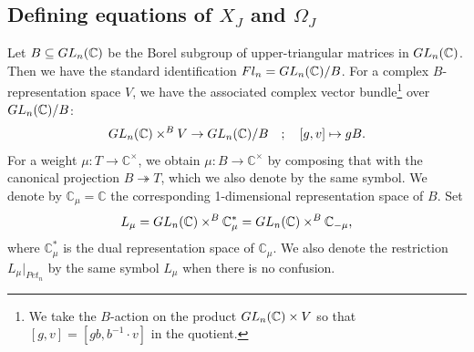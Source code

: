 \documentclass[11pt]{article}
\theoremstyle{definition}
\numberwithin{equation}{section}
\numberwithin{equation}{section}
\begin{document}
\subsection{Defining equations of \texorpdfstring{$X_J$}{XJ} and \texorpdfstring{$\Omega_J$}{OmegaJ}}\label{subsec: equation of X and Omega}
Let $B\subseteq {\rm GL}_n({\mathbb C})$ be the Borel subgroup of upper-triangular matrices in ${\rm GL}_n({\mathbb C})$. Then we have the standard identification $Fl_n={\rm GL}_n({\mathbb C})/B$. For a complex $B$-representation space $V$, we have the associated complex vector bundle\footnote{We take the $B$-action on the product ${\rm GL}_n({\mathbb C})\times V$ so that $[g,v]=[gb,b^{-1}\cdot v]$ in the quotient.} over ${\rm GL}_n({\mathbb C})/B$:
\begin{align*}
{\rm GL}_n({\mathbb C})\times^B V \rightarrow {\rm GL}_n({\mathbb C})/B
\quad ; \quad
[g,v]\mapsto gB.
\end{align*}
For a weight $\mu\colon T\rightarrow {\mathbb C}^{\times}$, we obtain $\mu\colon B\rightarrow {\mathbb C}^{\times}$ by composing that with the canonical projection $B\twoheadrightarrow T$, which we also denote by the same symbol. We denote by ${\mathbb C}_{\mu}={\mathbb C}$ the corresponding 1-dimensional representation space of $B$. Set
\begin{align}\label{eq: def of Lmu 2}
L_{\mu} = {\rm GL}_n({\mathbb C})\times^B {\mathbb C}_{\mu}^* = {\rm GL}_n({\mathbb C})\times^B {\mathbb C}_{-\mu},
\end{align}
where ${\mathbb C}_{\mu}^*$ is the dual representation space of ${\mathbb C}_{\mu}$. We also denote the restriction $L_{\mu}|_{Pet_{n}}$ by the same symbol $L_{\mu}$ when there is no confusion.
\end{document}
